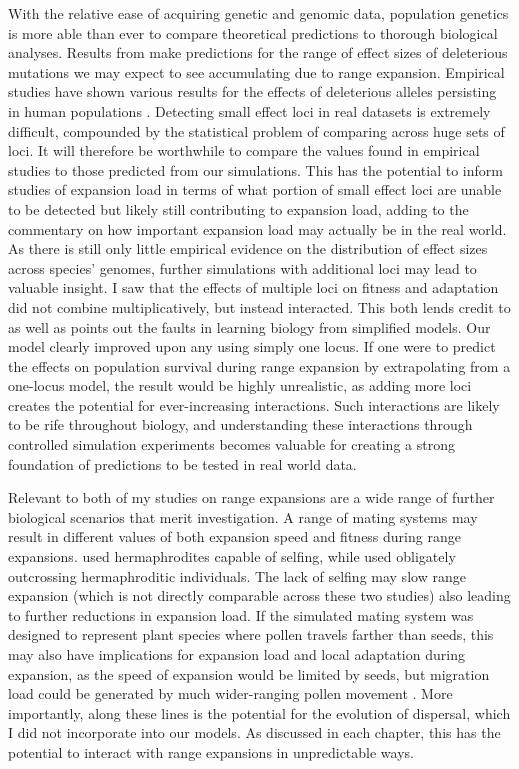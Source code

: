 With the relative ease of acquiring genetic and genomic data, population genetics is more able than ever to compare theoretical predictions to thorough biological analyses. Results from  make predictions for the range of effect sizes of deleterious mutations we may expect to see accumulating due to range expansion. Empirical studies have shown various results for the effects of deleterious alleles persisting in human populations \citep{Lohmueller:2008, Henn:2015, Do:2015}. Detecting small effect loci in real datasets is extremely difficult, compounded by the statistical problem of comparing across huge sets of loci. It will therefore be worthwhile to compare the values found in empirical studies to those predicted from our simulations. This has the potential to inform studies of expansion load in terms of what portion of small effect loci are unable to be detected but likely still contributing to expansion load, adding to the commentary on how important expansion load may actually be in the real world. As there is still only little empirical evidence on the distribution of effect sizes across species' genomes, further simulations with additional loci may lead to valuable insight. I saw that the effects of multiple loci on fitness and adaptation did not combine multiplicatively, but instead interacted. This both lends credit to as well as points out the faults in learning biology from simplified models. Our model clearly improved upon any using simply one locus. If one were to predict the effects on population survival during range expansion by extrapolating from a one-locus model, the result would be highly unrealistic, as adding more loci creates the potential for ever-increasing interactions. Such interactions are likely to be rife throughout biology, and understanding these interactions through controlled simulation experiments becomes valuable for creating a strong foundation of predictions to be tested in real world data. 

Relevant to both of my studies on range expansions are a wide range of further biological scenarios that merit investigation. A range of mating systems may result in different values of both expansion speed and fitness during range expansions.  used hermaphrodites capable of selfing, while  used obligately outcrossing hermaphroditic individuals. The lack of selfing may slow range expansion (which is not directly comparable across these two studies) also leading to further reductions in expansion load. If the simulated mating system was designed to represent plant species where pollen travels farther than seeds, this may also have implications for expansion load and local adaptation during expansion, as the speed of expansion would be limited by seeds, but migration load could be generated by much wider-ranging pollen movement \citep{Lopez:2008}. More importantly, along these lines is the potential for the evolution of dispersal, which I did not incorporate into our models. As discussed in each chapter, this has the potential to interact with range expansions in unpredictable ways.

